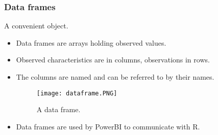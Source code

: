 \begin{frame}
    \frametitle{Data frames}
\begin{block}{A convenient object.}
    \begin{itemize}
        \item<+-> Data frames are arrays holding observed values.
        \item<+-> Observed characteristics are in columns, observations in rows.
        \item<+-> The columns are named and can be referred to by their names.
        \begin{figure}[htbp]
            \centering
           \texttt{[image: dataframe.PNG]}
            \caption{A data frame.}
            \label{fig:data_frame}
           \end{figure}
        \item<+-> Data frames are used by PowerBI to communicate with R.
    \end{itemize}
\end{block}
\end{frame}
